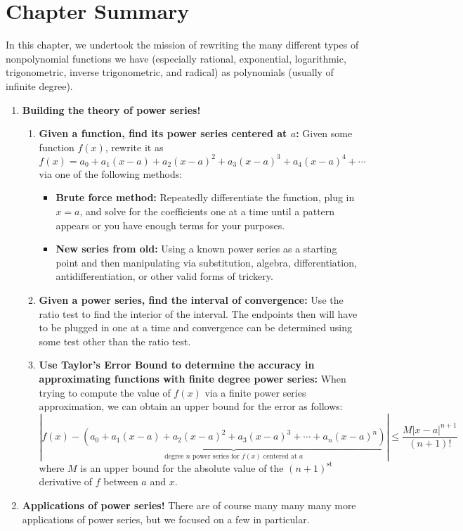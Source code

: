 \section{Chapter Summary}
In this chapter, we undertook the mission of rewriting the many different types of nonpolynomial functions we have (especially rational, exponential, logarithmic, trigonometric, inverse trigonometric, and radical) as polynomials (usually of infinite degree).
\begin{enumerate}
\item {\bf Building the theory of power series!}  
\begin{enumerate}
\item {\bf Given a function, find its power series centered at $a$:} Given some function $f(x)$, rewrite it as $$f(x)=a_0+a_1(x-a)+a_2(x-a)^2+a_3(x-a)^3+a_4(x-a)^4+\cdots$$
via one of the following methods: \begin{itemize}
\item {\bf Brute force method:}  Repeatedly differentiate the function, plug in $x=a$, and solve for the coefficients one at a time until a pattern appears or you have enough terms for your purposes.
\item {\bf New series from old:} Using a known power series as a starting point and then manipulating via substitution, algebra, differentiation, antidifferentiation, or other valid forms of trickery.
\end{itemize}
\item {\bf Given a power series, find the interval of convergence:} Use the ratio test to find the interior of the interval.  The endpoints then will have to be plugged in one at a time and convergence can be determined using some test other than the ratio test.
\item {\bf Use Taylor's Error Bound to determine the accuracy in approximating functions with finite degree power series:} When trying to compute the value of $f(x)$ via a finite power series approximation, we can obtain an upper bound for the error as follows: $$\left| f(x)- \underset{\text{degree }n\text{ power series for }f(x)\text{ centered at }a}
{\underbrace{\left(a_0+a_1\left(x-a\right)+a_2\left(x-a\right)^2+a_3\left(x-a\right)^3+\cdots+a_n\left(x-a\right)^n\right)}}\right|\leq \frac{M|x-a|^{n+1}}{(n+1)!} $$
where $M$ is an upper bound for the absolute value of the $(n+1)^{\text{st}}$ derivative of $f$ between $a$ and $x$.
\end{enumerate}
\item {\bf Applications of power series!}  There are of course many many many more applications of power series, but we focused on a few in particular.

\end{enumerate}
